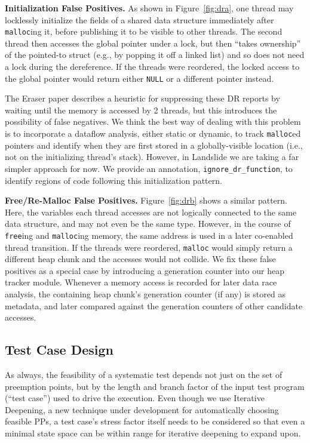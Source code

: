 \documentclass{article}
\begin{document}
{\bf Initialization False Positives.} As shown in Figure~\ref{fig:dra}, one thread may locklessly initialize the fields of a shared data structure immediately after {\tt malloc}ing it, before publishing it to be visible to other threads. The second thread then accesses the global pointer under a lock, but then ``takes ownership'' of the pointed-to struct (e.g., by popping it off a linked list) and so does not need a lock during the dereference. If the threads were reordered, the locked access to the global pointer would return either {\tt NULL} or a different pointer instead.

The Eraser paper \cite{eraser} describes a heuristic for suppressing these DR reports by waiting until the memory is accessed by 2 threads, but this introduces the possibility of false negatives.
We think the best way of dealing with this problem is to incorporate a dataflow analysis, either static or dynamic, to track {\tt malloc}ed pointers and identify when they are first stored in a globally-visible location (i.e., not on the initializing thread's stack).
However, in Landslide we are taking a far simpler approach for now. We provide an annotation, {\tt ignore\_dr\_function}, to identify regions of code following this initialization pattern.

{\bf Free/Re-Malloc False Positives.} Figure~\ref{fig:drb} shows a similar pattern. Here, the variables each thread accesses are not logically connected to the same data structure, and may not even be the same type. However, in the course of {\tt free}ing and {\tt malloc}ing memory, the same address is used in a later co-enabled thread transition. If the threads were reordered, {\tt malloc} would simply return a different heap chunk and the accesses would not collide. We fix these false positives as a special case by introducing a generation counter into our heap tracker module. Whenever a memory access is recorded for later data race analysis, the containing heap chunk's generation counter (if any) is stored as metadata, and later compared against the generation counters of other candidate accesses.

\subsection{Test Case Design}

As always, the feasibility of a systematic test depends not just on the set of preemption points, but by the length and branch factor of the input test program (``test case'') used to drive the execution.
Even though we use Iterative Deepening, a new technique under development for automatically choosing feasible PPs, a test case's stress factor itself needs to be considered so that even a minimal state space can be within range for iterative deepening to expand upon.
\end{document}
